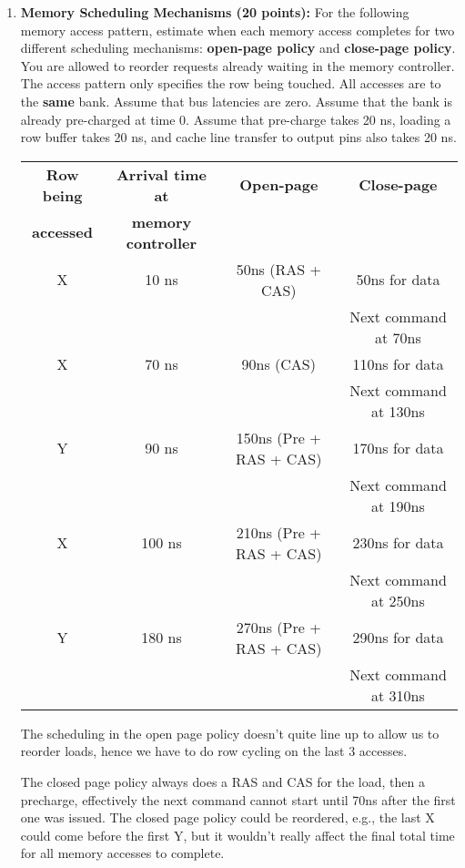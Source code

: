 \documentclass[a4paper, 11pt]{exam}
\begin{document}
\begin{enumerate}
 \item \textbf{Memory Scheduling Mechanisms (20 points): } For the following memory access pattern, estimate when each memory access completes for two different scheduling mechanisms: \textbf{open-page policy} and \textbf{close-page policy}. You are allowed to reorder requests already waiting in the memory controller. The access pattern only specifies the row being touched. All accesses are to the \textbf{same} bank. Assume that bus latencies are zero. Assume that the bank is already pre-charged at time 0. Assume that pre-charge takes 20 ns, loading a row buffer takes 20 ns, and cache line transfer to output pins also takes 20 ns.\newline


\begin{center}
\footnotesize
\begin{tabular}{|c|c|c|c|}
 \hline
 \textbf{Row being} & \textbf{Arrival time at} & \textbf{Open-page} & \textbf{Close-page} \\
  \textbf{accessed} & \textbf{memory controller} & & \\
 \hline
 X  & 10 ns & 50ns (RAS + CAS) & 50ns for data \\
    &       &                  & Next command at 70ns\\
 \hline
 X  & 70 ns & 90ns (CAS)  & 110ns for data\\
    &       &             & Next command at 130ns\\
 \hline
 Y  & 90 ns & 150ns (Pre + RAS + CAS) & 170ns for data\\
    &       &                  & Next command at 190ns\\
 \hline
 X  & 100 ns & 210ns (Pre + RAS + CAS) & 230ns for data\\
    &       &                  & Next command at 250ns\\
 \hline
 Y  & 180 ns & 270ns (Pre + RAS + CAS)  & 290ns for data\\
    &       &                  & Next command at 310ns\\
 \hline
 \end{tabular}
\end{center}
The scheduling in the open page policy doesn't quite line up to allow us
to reorder loads, hence we have to do row cycling on the last 3 accesses.

The closed page policy always does a RAS and CAS for the load, then a precharge,
effectively the next command cannot start until 70ns after the first one was
issued. The closed page policy could be reordered, e.g., the last X 
could come before the first Y, but it wouldn't really affect the final total
time for all memory accesses to complete.
 

\end{enumerate}
\end{document}
